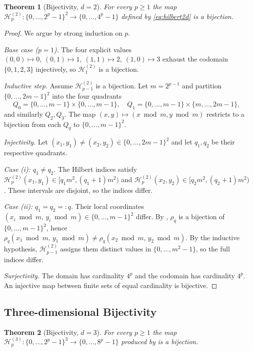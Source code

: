 \documentclass[11pt,a4paper]{article}
\theoremstyle{plain}
\newtheorem{theorem}{Theorem}[section]
\theoremstyle{definition}
\theoremstyle{remark}
\newcommand{\Hil}{\mathcal{H}}
\begin{document}
\begin{theorem}[Bijectivity, $d=2$]\label{thm:bij2d}
For every $p\geq 1$ the map
$\Hil_p^{(2)}:\{0,\dots,2^p-1\}^2\to \{0,\dots,4^p-1\}$ defined by
\eqref{eq:hilbert2d} is a bijection.
\end{theorem}

\begin{proof}
We argue by strong induction on $p$.

\emph{Base case ($p=1$).} The four explicit values
$(0,0)\mapsto 0,\ (0,1)\mapsto 1,\ (1,1)\mapsto 2,\ (1,0)\mapsto 3$
exhaust the codomain $\{0,1,2,3\}$ injectively, so $\Hil_1^{(2)}$ is a
bijection.

\emph{Inductive step.} Assume $\Hil_{p-1}^{(2)}$ is a bijection. Let
$m = 2^{p-1}$ and partition $\{0,\dots,2m-1\}^2$ into the four quadrants
\[
Q_0 = \{0,\dots,m{-}1\}\times\{0,\dots,m{-}1\},\quad
Q_1 = \{0,\dots,m{-}1\}\times\{m,\dots,2m{-}1\},
\]
and similarly $Q_2,Q_3$. The map
$(x,y)\mapsto (x\bmod m,y\bmod m)$ restricts to a bijection from each
$Q_q$ to $\{0,\dots,m{-}1\}^2$.

\emph{Injectivity.} Let $(x_1,y_1)\ne (x_2,y_2)\in\{0,\dots,2m-1\}^2$
and let $q_1,q_2$ be their respective quadrants.

\emph{Case (i): $q_1\ne q_2$.} The Hilbert indices satisfy
$\Hil_p^{(2)}(x_1,y_1)\in [q_1 m^2,(q_1+1)m^2)$ and
$\Hil_p^{(2)}(x_2,y_2)\in [q_2 m^2,(q_2+1)m^2)$. These intervals are
disjoint, so the indices differ.

\emph{Case (ii): $q_1=q_2=:q$.} Their local coordinates
$(x_i\bmod m,\, y_i\bmod m)\in \{0,\dots,m-1\}^2$ differ. By
, $\rho_q$ is a bijection of
$\{0,\dots,m-1\}^2$, hence
$\rho_q(x_1\bmod m,\,y_1\bmod m) \ne \rho_q(x_2\bmod m,\,y_2\bmod m)$.
By the inductive hypothesis, $\Hil_{p-1}^{(2)}$ assigns them distinct
values in $\{0,\dots,m^2-1\}$, so the full indices differ.

\emph{Surjectivity.} The domain has cardinality $4^p$ and the codomain
has cardinality $4^p$. An injective map between finite sets of equal
cardinality is bijective.
\end{proof}

\subsection{Three-dimensional Bijectivity}\label{sec:bij_3d}

\begin{theorem}[Bijectivity, $d=3$]\label{thm:bij3d}
For every $p\geq 1$ the map
$\Hil_p^{(3)}:\{0,\dots,2^p-1\}^3\to \{0,\dots,8^p-1\}$ produced by
 is a bijection.
\end{theorem}
\end{document}
